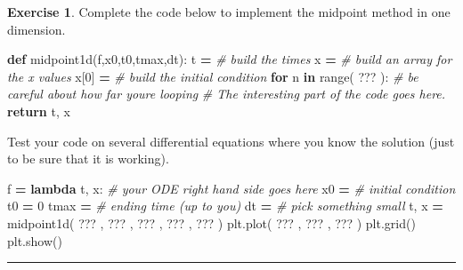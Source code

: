 \documentclass[
]{book}
\newenvironment{Shaded}{\begin{snugshade}}{\end{snugshade}}
\newcommand{\BuiltInTok}[1]{#1}
\newcommand{\CommentTok}[1]{\textcolor[rgb]{0.56,0.35,0.01}{\textit{#1}}}
\newcommand{\ControlFlowTok}[1]{\textcolor[rgb]{0.13,0.29,0.53}{\textbf{#1}}}
\newcommand{\DecValTok}[1]{\textcolor[rgb]{0.00,0.00,0.81}{#1}}
\newcommand{\KeywordTok}[1]{\textcolor[rgb]{0.13,0.29,0.53}{\textbf{#1}}}
\newcommand{\NormalTok}[1]{#1}
\newcommand{\OperatorTok}[1]{\textcolor[rgb]{0.81,0.36,0.00}{\textbf{#1}}}
\theoremstyle{definition}
\theoremstyle{definition}
\theoremstyle{definition}
\newtheorem{exercise}{Exercise}[chapter]
\theoremstyle{remark}
\begin{document}
\begin{exercise}
\protect\hypertarget{exr:unnamed-chunk-441}{}{\label{exr:unnamed-chunk-441} }Complete the code below to implement the midpoint method in one dimension.
\end{exercise}

\begin{Shaded}
\begin{Highlighting}[]
\KeywordTok{def}\NormalTok{ midpoint1d(f,x0,t0,tmax,dt):}
\NormalTok{    t }\OperatorTok{=} \CommentTok{\# build the times}
\NormalTok{    x }\OperatorTok{=} \CommentTok{\# build an array for the x values}
\NormalTok{    x[}\DecValTok{0}\NormalTok{] }\OperatorTok{=} \CommentTok{\# build the initial condition}
    \ControlFlowTok{for}\NormalTok{ n }\KeywordTok{in} \BuiltInTok{range}\NormalTok{( ??? ): }\CommentTok{\# be careful about how far you\textquotesingle{}re looping}
        \CommentTok{\# The interesting part of the code goes here.}
    \ControlFlowTok{return}\NormalTok{ t, x}
\end{Highlighting}
\end{Shaded}

Test your code on several differential equations where you know the solution (just to be sure that it is working).

\begin{Shaded}
\begin{Highlighting}[]
\NormalTok{f }\OperatorTok{=} \KeywordTok{lambda}\NormalTok{ t, x: }\CommentTok{\# your ODE right hand side goes here}
\NormalTok{x0 }\OperatorTok{=} \CommentTok{\# initial condition}
\NormalTok{t0 }\OperatorTok{=} \DecValTok{0}
\NormalTok{tmax }\OperatorTok{=} \CommentTok{\# ending time (up to you)}
\NormalTok{dt }\OperatorTok{=} \CommentTok{\# pick something small}
\NormalTok{t, x }\OperatorTok{=}\NormalTok{ midpoint1d( ??? , ??? , ??? , ??? , ??? )}
\NormalTok{plt.plot( ??? , ??? , ??? )}
\NormalTok{plt.grid()}
\NormalTok{plt.show()}
\end{Highlighting}
\end{Shaded}

\begin{center}\rule{0.5\linewidth}{0.5pt}\end{center}
\end{document}
